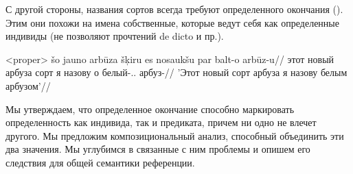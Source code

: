 \documentclass[a4paper, 12pt]{article}
\begin{document}
С другой стороны, названия сортов всегда требуют определенного окончания (\nextx). Этим они похожи на имена собственные, которые ведут себя как определенные индивиды (не позволяют прочтений de dicto и пр.).

\ex<proper>
    \begingl
        \gla šo jauno arbūza šķiru es nosaukšu par balt-o arbūz-u//
        \glb этот новый арбуза сорт я назову о белый-\M.\Def.\Acc{} арбуз-\Acc{}//
        \glft 'Этот новый сорт арбуза я назову белым арбузом'//
    \endgl
\xe

Мы утверждаем, что определенное окончание способно маркировать определенность как индивида, так и предиката, причем ни одно не влечет другого. Мы предложим композициональный анализ, способный объединить эти два значения. Мы углубимся в связанные с ним проблемы и опишем его следствия для общей семантики референции.

\printglossaries



\end{document}
